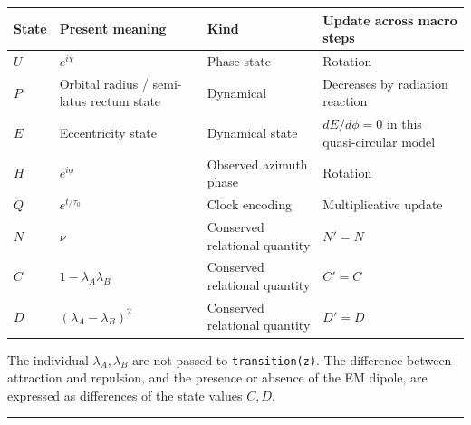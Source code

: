 \documentclass[
  a4paper,
]{article}
\newcounter{none} %
\begin{document}
{\def\LTcaptype{none} %
\begin{longtable}[]{@{}
  >{\raggedright\arraybackslash}p{}
  >{\raggedright\arraybackslash}p{}
  >{\raggedright\arraybackslash}p{}
  >{\raggedright\arraybackslash}p{}@{}}
\toprule\noalign{}
\begin{minipage}[b]{\linewidth}\raggedright
State
\end{minipage} & \begin{minipage}[b]{\linewidth}\raggedright
Present meaning
\end{minipage} & \begin{minipage}[b]{\linewidth}\raggedright
Kind
\end{minipage} & \begin{minipage}[b]{\linewidth}\raggedright
Update across macro steps
\end{minipage} \\
\midrule\noalign{}
\endhead
\bottomrule\noalign{}
\endlastfoot
\(U\) & \(e^{i\chi}\) & Phase state & Rotation \\
\(P\) & Orbital radius / semi-latus rectum state & Dynamical & Decreases
by radiation reaction \\
\(E\) & Eccentricity state & Dynamical state & \(dE/d\phi=0\) in this
quasi-circular model \\
\(H\) & \(e^{i\phi}\) & Observed azimuth phase & Rotation \\
\(Q\) & \(e^{t/\tau_0}\) & Clock encoding & Multiplicative update \\
\(N\) & \(\nu\) & Conserved relational quantity & \(N'=N\) \\
\(C\) & \(1-\lambda_A\lambda_B\) & Conserved relational quantity &
\(C'=C\) \\
\(D\) & \((\lambda_A-\lambda_B)^2\) & Conserved relational quantity &
\(D'=D\) \\
\end{longtable}
}

The individual \(\lambda_A,\lambda_B\) are not passed to
\texttt{transition(z)}. The difference between attraction and repulsion,
and the presence or absence of the EM dipole, are expressed as
differences of the state values \(C,D\).

\begin{center}\rule{0.5\linewidth}{0.5pt}\end{center}
\end{document}
